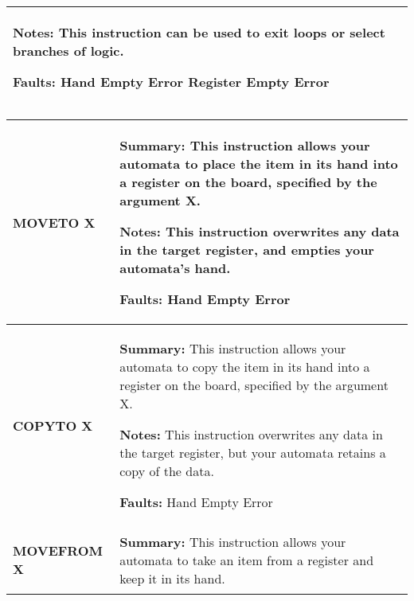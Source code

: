 \begin{center}
\begin{tabular}{ | m{3cm} | m{11cm} | }
            \textbf{Notes:} 
            \newline This instruction can be used to exit loops or select branches of logic.

            \textbf{Faults:}
            \newline Hand Empty Error
            \newline Register Empty Error\\
        \hline
    \end{tabular}

    \begin{tabular}{ | m{3cm} | m{11cm} | } 
        \hline
            \begin{center}
                \textbf{MOVETO X} 
            \end{center}& 
            \textbf{Summary:} 
            \newline This instruction allows your automata to place the item in its hand into a register on the board, specified by the argument X.

    
            \textbf{Notes:} 
            \newline This instruction overwrites any data in the target register, and empties your automata’s hand.
    
            \textbf{Faults:}
            \newline Hand Empty Error\\
        \hline
            \begin{center}
                \textbf{COPYTO X} 
            \end{center}& 
            \textbf{Summary:} 
            \newline This instruction allows your automata to copy the item in its hand into a register on the board, specified by the argument X.
    
            \textbf{Notes:} 
            \newline This instruction overwrites any data in the target register, but your automata retains a copy of the data.
    
            \textbf{Faults:}
            \newline Hand Empty Error\\
        \hline
            \begin{center}
                \textbf{MOVEFROM X} 
            \end{center}& 
            \textbf{Summary:} 
            \newline This instruction allows your automata to take an item from a register and keep it in its hand.


\end{tabular}
\end{center}

